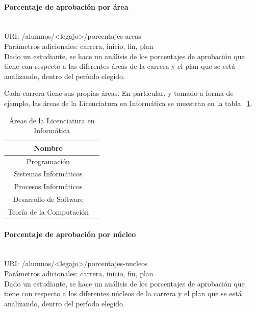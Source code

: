 \paragraph{Porcentaje de aprobación por área}\mbox{}\\

URI: /alumnos/<legajo>/porcentajes-areas \\

Parámetros adicionales: carrera, inicio, fin, plan \\

Dado un estudiante, se hace un análisis de los porcentajes de aprobación que tiene con respecto a las diferentes áreas de la carrera y el plan que se está analizando, dentro del período elegido.

Cada carrera tiene sus propias áreas. En particular, y tomado a forma de ejemplo, las áreas de la Licenciatura en Informática se muestran en la tabla ~\ref{tab:tabla_areas}.

\begin{table}[!htbp]
    \centering
    \makegapedcells
    \begin{tabular}{|c|c|}
    \hline
    Nombre \\ \hline
    Programación \\ \hline
    Sistemas Informáticos \\ \hline
    Procesos Informáticos\\ \hline
    Desarrollo de Software \\ \hline
    Teoría de la Computación \\ \hline
    \end{tabular}
    \caption{Áreas de la Licenciatura en Informática}
    \label{tab:tabla_areas}
\end{table}

\paragraph{Porcentaje de aprobación por núcleo}\mbox{}\\

URI: /alumnos/<legajo>/porcentajes-nucleos \\

Parámetros adicionales: carrera, inicio, fin, plan \\

Dado un estudiante, se hace un análisis de los porcentajes de aprobación que tiene con respecto a los diferentes núcleos de la carrera y el plan que se está analizando, dentro del período elegido.

